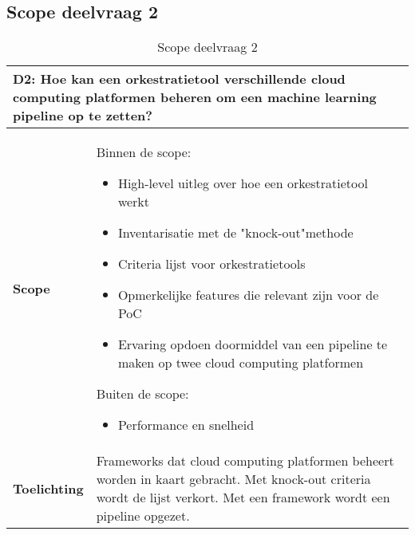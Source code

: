 \subsection*{Scope deelvraag 2}\label{appendix:scope-subquestion-2}
\begin{table}[hbt!]
  \centering
  \begin{tabular}{|p{.215\linewidth}|p{.72\linewidth}|}
  \hline
  \multicolumn{2}{|p{.97\linewidth}|}{\textbf{D2: Hoe kan een orkestratietool verschillende cloud computing platformen beheren om een machine learning pipeline op te zetten?}} \\ \hline
    \textbf{Scope}&
      Binnen de scope:
      \begin{itemize}
        \item High-level uitleg over hoe een orkestratietool werkt
        \item Inventarisatie met de "knock-out"\space methode
        \item Criteria lijst voor orkestratietools
        \item Opmerkelijke features die relevant zijn voor de PoC
        \item Ervaring opdoen doormiddel van een pipeline te maken op twee cloud computing platformen
      \end{itemize}
      Buiten de scope:
      \begin{itemize}
        \item Performance en snelheid
      \end{itemize}
    \\ \hline
    \textbf{Toelichting}&
      Frameworks dat cloud computing platformen beheert worden in kaart gebracht. Met knock-out criteria wordt de lijst verkort. Met een framework wordt een pipeline opgezet.
    \\ \hline
  \end{tabular}
  \caption{Scope deelvraag 2}
  \label{table:scope-subquestion-2}
  \end{table}


